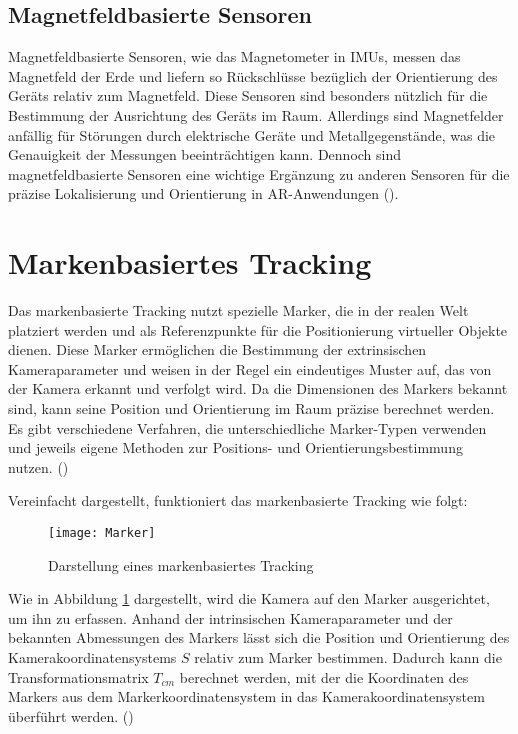\subsection{Magnetfeldbasierte Sensoren}

Magnetfeldbasierte Sensoren, wie das Magnetometer in IMUs, messen das Magnetfeld der Erde und liefern so Rückschlüsse bezüglich der Orientierung des Geräts relativ zum Magnetfeld. Diese Sensoren sind besonders nützlich für die Bestimmung der Ausrichtung des Geräts im Raum. Allerdings sind Magnetfelder anfällig für Störungen durch elektrische Geräte und Metallgegenstände, was die Genauigkeit der Messungen beeinträchtigen kann. Dennoch sind magnetfeldbasierte Sensoren eine wichtige Ergänzung zu anderen Sensoren für die präzise Lokalisierung und Orientierung in AR-Anwendungen (\cite{doerner2022virtual}).

\section{Markenbasiertes Tracking}\label{Markerbasiertes Tracking}

Das markenbasierte Tracking nutzt spezielle Marker, die in der realen Welt platziert werden und als Referenzpunkte für die Positionierung virtueller Objekte dienen. Diese Marker ermöglichen die Bestimmung der extrinsischen Kameraparameter und weisen in der Regel ein eindeutiges Muster auf, das von der Kamera erkannt und verfolgt wird. Da die Dimensionen des Markers bekannt sind, kann seine Position und Orientierung im Raum präzise berechnet werden. Es gibt verschiedene Verfahren, die unterschiedliche Marker-Typen verwenden und jeweils eigene Methoden zur Positions- und Orientierungsbestimmung nutzen. (\cite{doerner2022virtual}) 

Vereinfacht dargestellt, funktioniert das markenbasierte Tracking wie folgt:

\begin{figure}
    \centering
    \texttt{[image: Marker]}
    \caption{Darstellung eines markenbasiertes Tracking\label{fig:Marker}}\par
\end{figure}

Wie in Abbildung \ref{fig:Marker} dargestellt, wird die Kamera auf den Marker ausgerichtet, um ihn zu erfassen. Anhand der intrinsischen Kameraparameter und der bekannten Abmessungen des Markers lässt sich die Position und Orientierung des Kamerakoordinatensystems \( S \) relativ zum Marker bestimmen. Dadurch kann die Transformationsmatrix \( T_{cm} \) berechnet werden, mit der die Koordinaten des Markers aus dem Markerkoordinatensystem in das Kamerakoordinatensystem überführt werden. (\cite{doerner2022virtual})

